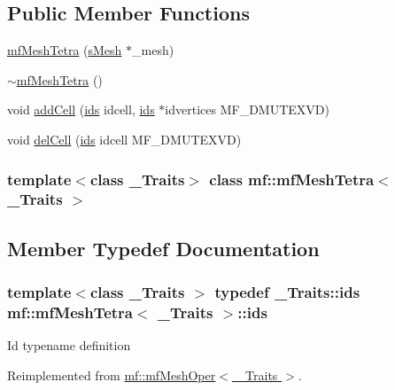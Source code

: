 \subsection*{Public Member Functions}
\begin{DoxyCompactItemize}
\item 
\hyperlink{classmf_1_1mfMeshTetra_ad12f5ae64d785b5af6bd2753f4326ed9}{mfMeshTetra} (\hyperlink{classmf_1_1mfMeshOper_a96c05da9a054cf9ac58d15211922f936}{sMesh} $\ast$\_\-mesh)
\item 
\hyperlink{classmf_1_1mfMeshTetra_a20f8cd32b95463e348cd41a0a47e543f}{$\sim$mfMeshTetra} ()
\item 
void \hyperlink{classmf_1_1mfMeshTetra_a632bfd4a2844c8df3f3d40752fc6f72b}{addCell} (\hyperlink{classmf_1_1mfMeshOper_a526d1466339244781fbdc0dbfe5ad210}{ids} idcell, \hyperlink{classmf_1_1mfMeshOper_a526d1466339244781fbdc0dbfe5ad210}{ids} $\ast$idvertices MF\_\-DMUTEXVD)
\item 
void \hyperlink{classmf_1_1mfMeshTetra_af77ff3cb397cb9aca88e58004519e5f8}{delCell} (\hyperlink{classmf_1_1mfMeshOper_a526d1466339244781fbdc0dbfe5ad210}{ids} idcell MF\_\-DMUTEXVD)
\end{DoxyCompactItemize}
\subsubsection*{template$<$class \_\-Traits$>$ class mf::mfMeshTetra$<$ \_\-Traits $>$}



\subsection{Member Typedef Documentation}
\hypertarget{classmf_1_1mfMeshTetra_adbcfde79b2f9076ed56ea0e373508967}{
\subsubsection[{ids}]{\setlength{\rightskip}{0pt plus 5cm}template$<$class \_\-Traits $>$ typedef \_\-Traits::ids {\bf mf::mfMeshTetra}$<$ \_\-Traits $>$::{\bf ids}}}
\label{classmf_1_1mfMeshTetra_adbcfde79b2f9076ed56ea0e373508967}
Id typename definition 

Reimplemented from \hyperlink{classmf_1_1mfMeshOper_a526d1466339244781fbdc0dbfe5ad210}{mf::mfMeshOper$<$ \_\-Traits $>$}.

